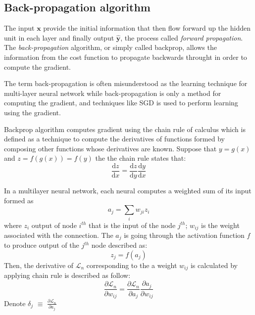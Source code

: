 \subsection{Back-propagation algorithm}
\hspace{0.45cm}The input $\pmb{x}$ provide the initial information that then flow forward up the hidden unit in each layer and finally output $\hat{\pmb{y}}$, the process called \textit{forward propagation}\cite{Goodfellow-et-al-2016}. The \textit{back-propagation} algorithm, or simply called backprop, allows the information from the cost function to propagate backwards throught in order to compute the gradient.\par
The term back-propagation is often misunderstood as the learning technique for multi-layer neural network while back-propagation is only a method for computing the gradient, and techniques like \acrshort{SGD} is used to perform learning using the gradient.\par
Backprop algorithm computes gradient using the chain rule of calculus which is defined as a technique to compute the derivatives of functions formed by composing other functions whose derivatives are known\cite{Goodfellow-et-al-2016}. Suppose that $y=g(x)$ and $z = f(g(x)) = f(y)$ the the chain rule states that:
\begin{equation}
    \frac{\text{d}z}{\text{d}x}  = \frac{\text{d}z}{\text{d}y}\frac{\text{d}y}{\text{d}x}
\end{equation}\par
In a multilayer neural network, each neural computes a weighted sum of its input formed as
\begin{equation}
    a_j = \underset{i}{\sum}w_{ji}z_i
\end{equation}
where $z_i$ output of node $i^{th}$ that is the input of the node $j^{th}$; $w_{ij}$ is the weight associated with the connection. The $a_j$ is going through the activation function $f$ to produce output of the $j^{th}$
node described as:
\begin{equation}
    z_j = f(a_j)
\end{equation}
Then, the derivative of $\mathcal{L}_n$ corresponding to the a weight $w_{ij}$ is calculated by applying chain rule is described as follow:
\begin{equation}
    \frac{\partial \mathcal{L}_n}{ \partial w_{ij}} = \frac{\partial \mathcal{L}_n}{ \partial a_{j}}\frac{\partial a_{j}}{ \partial w_{ij}}
\end{equation}
Denote $\delta_j$ $\equiv$ $\frac{\partial \mathcal{L}_n}{ \partial a_{j}}$

